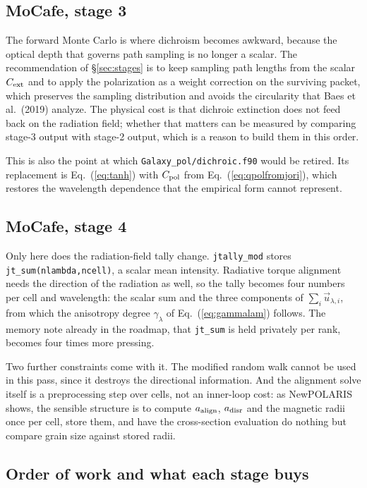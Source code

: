 \documentclass{my_memo}
\newcommand{\code}[1]{\texttt{#1}}
\newcommand{\Cext}{\ensuremath{C_{\rm ext}}}
\newcommand{\Cpol}{\ensuremath{C_{\rm pol}}}
\begin{document}
\subsection{MoCafe, stage 3}

The forward Monte Carlo is where dichroism becomes awkward, because the
optical depth that governs path sampling is no longer a scalar. The
recommendation of \S\ref{sec:stages} is to keep sampling path lengths
from the scalar $\Cext$ and to apply the polarization as a weight
correction on the surviving packet, which preserves the sampling
distribution and avoids the circularity that Baes et al.\ (2019)
analyze. The physical cost is that dichroic extinction does not feed
back on the radiation field; whether that matters can be measured by
comparing stage-3 output with stage-2 output, which is a reason to build
them in this order.

This is also the point at which \code{Galaxy\_pol/dichroic.f90} would be
retired. Its replacement is Eq.~(\ref{eq:tanh}) with $\Cpol$ from
Eq.~(\ref{eq:qpolfromjori}), which restores the wavelength dependence
that the empirical form cannot represent.

\subsection{MoCafe, stage 4}

Only here does the radiation-field tally change.
\code{jtally\_mod} stores \code{jt\_sum(nlambda,ncell)}, a scalar mean
intensity. Radiative torque alignment needs the direction of the
radiation as well, so the tally becomes four numbers per cell and
wavelength: the scalar sum and the three components of
$\sum_i \vec{u}_{\lambda,i}$, from which the anisotropy degree
$\gamma_\lambda$ of Eq.~(\ref{eq:gammalam}) follows. The memory note
already in the roadmap, that \code{jt\_sum} is held privately per rank,
becomes four times more pressing.

Two further constraints come with it. The modified random walk cannot be
used in this pass, since it destroys the directional information. And
the alignment solve itself is a preprocessing step over cells, not an
inner-loop cost: as NewPOLARIS shows, the sensible structure is to
compute $a_{\rm align}$, $a_{\rm disr}$ and the magnetic radii once per
cell, store them, and have the cross-section evaluation do nothing but
compare grain size against stored radii.

\subsection{Order of work and what each stage buys}
\end{document}
